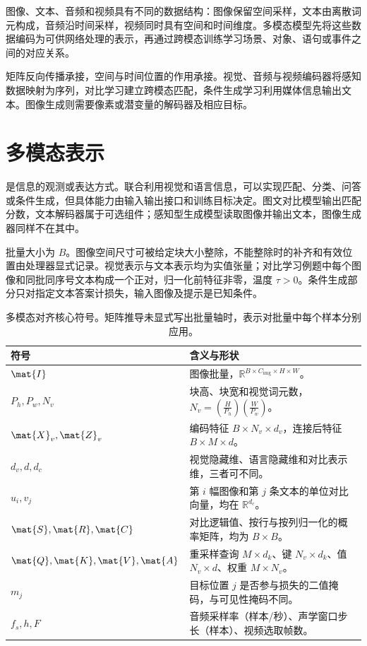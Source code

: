 \documentclass[../textbook.tex]{subfiles}
\begin{document}
\fi
{}

图像、文本、音频和视频具有不同的数据结构：图像保留空间采样，文本由离散词元构成，音频沿时间采样，视频同时具有空间和时间维度。多模态模型先将这些数据编码为可供网络处理的表示，再通过跨模态训练学习场景、对象、语句或事件之间的对应关系。

矩阵反向传播承接，空间与时间位置的作用承接。视觉、音频与视频编码器将感知数据映射为序列，对比学习建立跨模态匹配，条件生成学习利用媒体信息输出文本。图像生成则需要像素或潜变量的解码器及相应目标。

\section{多模态表示}

是信息的观测或表达方式。联合利用视觉和语言信息，可以实现匹配、分类、问答或条件生成，但具体能力由输入输出接口和训练目标决定。图文对比模型输出匹配分数，文本解码器属于可选组件；感知型生成模型读取图像并输出文本，图像生成器同样不在其中。

\begin{assumption}[本章的张量与学习约定]
批量大小为 $B$。图像空间尺寸可被给定块大小整除，不能整除时的补齐和有效位置由处理器显式记录。视觉表示与文本表示均为实值张量；对比学习例题中每个图像和同批同序号文本构成一个正对，归一化前特征非零，温度 $\tau>0$。条件生成部分只对指定文本答案计损失，输入图像及提示是已知条件。
\end{assumption}

\begin{table}[htbp]
\centering
\caption[多模态对齐核心符号]{多模态对齐核心符号。矩阵推导未显式写出批量轴时，表示对批量中每个样本分别应用。}\label{tab:multimodal-symbols}
\begin{tabular}{ll}
\toprule 符号 & 含义与形状\\
\midrule
$\mat{I}$ & 图像批量，$\mathbb R^{B\times C_{\mathrm{img}}\times H\times W}$。\\
$P_h,P_w,N_v$ & 块高、块宽和视觉词元数，$N_v=\left(\frac{H}{P_h}\right)\left(\frac{W}{P_w}\right)$。\\
$\mat{X}_v,\mat{Z}_v$ & 编码特征 $B\times N_v\times d_v$，连接后特征 $B\times M\times d$。\\
$d_v,d,d_c$ & 视觉隐藏维、语言隐藏维和对比表示维，三者可不同。\\
$u_i,v_j$ & 第 $i$ 幅图像和第 $j$ 条文本的单位对比向量，均在 $\mathbb R^{d_c}$。\\
$\mat{S},\mat{R},\mat{C}$ & 对比逻辑值、按行与按列归一化的概率矩阵，均为 $B\times B$。\\
$\mat{Q},\mat{K},\mat{V},\mat{A}$ & 重采样查询 $M\times d_k$、键 $N_v\times d_k$、值 $N_v\times d$、权重 $M\times N_v$。\\
$m_j$ & 目标位置 $j$ 是否参与损失的二值掩码，与可见性掩码不同。\\
$f_s,h,F$ & 音频采样率（样本/秒）、声学窗口步长（样本）、视频选取帧数。\\
\bottomrule
\end{tabular}
\end{table}
\end{document}
